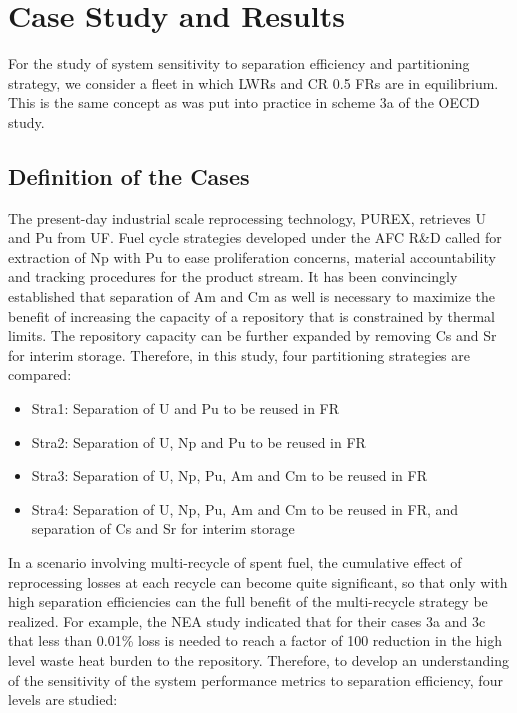 \section{Case Study and Results}
\label{ses_sec:case_study}
For the study of system sensitivity to separation efficiency and
partitioning strategy, we consider a fleet in which LWRs and CR 0.5 FRs
are in equilibrium.  This is the same concept as was put into practice
in scheme 3a of the OECD study.


\subsection{Definition of the Cases}
\label{ses_sec:case_def}
The present-day industrial scale reprocessing technology, PUREX,
retrieves U and Pu from UF. Fuel cycle strategies developed under the
AFC R\&D called for extraction of Np with Pu
to ease proliferation concerns, material accountability and tracking
procedures for the product stream. It has been convincingly established
\cite{Wiegland2006} that separation of Am and Cm as well is necessary to
maximize the benefit of increasing the capacity of a repository that is
constrained by thermal limits.  The repository capacity can be further
expanded by removing Cs and Sr for interim storage. Therefore, in this
study, four partitioning strategies are compared:

\begin{itemize}
    \item Stra1: Separation of U and Pu to be reused in FR
    \item Stra2: Separation of U, Np and Pu to be reused in FR
    \item Stra3: Separation of U, Np, Pu, Am and Cm to be reused in FR
    \item Stra4: Separation of U, Np, Pu, Am and Cm to be reused in FR, and
          separation of Cs and Sr for interim storage
\end{itemize}

In a scenario involving multi-recycle of spent fuel, the cumulative
effect of reprocessing losses at each recycle can become quite
significant, so that only with high separation efficiencies can the full
benefit of the multi-recycle strategy be realized.  For example, the NEA
study indicated that for their cases 3a and 3c that less than 0.01\% loss is
needed to reach a factor of 100 reduction in the high level waste heat
burden to the repository.  Therefore, to develop an understanding of the
sensitivity of the system performance metrics to separation efficiency,
four levels are studied:

